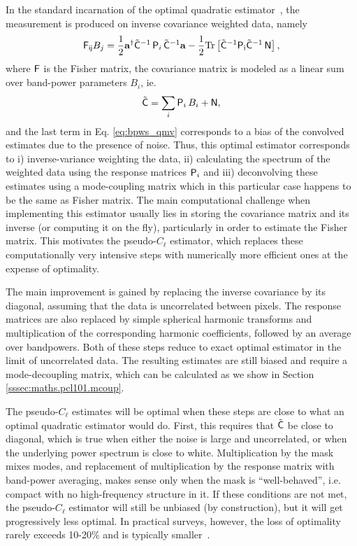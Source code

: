\documentclass[usenatbib]{mnrasb}
\newcommand{\va}{{\mathbf{a}}}
\begin{document}
        In the standard incarnation of the optimal quadratic estimator~\citep{1998PhRvD..57.2117B}, the measurement is produced on inverse covariance weighted data, namely
        \begin{equation}
          {\sf F_{ij}} B_j = \frac{1}{2}\va^\dagger \tilde{\sf C}^{-1}\,{\sf P}_i\,\tilde{\sf C}^{-1} \va -
          \frac{1}{2}\rm{Tr}\left[\tilde{\sf C}^{-1}{\sf P}_i\tilde{\sf C}^{-1}\,{\sf N} \right],
        \end{equation}
        where ${\sf F}$ is the Fisher matrix, the covariance matrix is modeled as a linear sum over band-power parameters $B_i$, ie.
        \begin{equation}\label{eq:bpws_qmv}
          \tilde{\sf C} = \sum_i {\sf P}_i\,B_i + {\sf N},
        \end{equation}
        and the last term in Eq. \ref{eq:bpws_qmv} corresponds to a bias of the convolved estimates due to the presence of noise. Thus, this optimal estimator corresponds to i) inverse-variance weighting the data, ii) calculating the spectrum of the weighted data using the response matrices ${\sf P}_i$ and iii) deconvolving these estimates using a mode-coupling matrix which in this particular case happens to be the same as Fisher matrix. The main computational challenge when implementing this estimator usually lies in storing the covariance matrix and its inverse (or computing it on the fly), particularly in order to estimate the Fisher matrix. This motivates the pseudo-$C_\ell$ estimator, which replaces these computationally very intensive steps with numerically more efficient ones at the expense of optimality.

        The main improvement is gained by replacing the inverse covariance by its diagonal, assuming that the data is uncorrelated between pixels. The response matrices are also replaced by simple spherical harmonic transforms and multiplication of the corresponding harmonic coefficients, followed by an average over bandpowers. Both of these steps reduce to exact optimal estimator in the limit of uncorrelated data. The resulting estimates are still biased and require a mode-decoupling matrix, which can be calculated as we show in Section \ref{sssec:maths.pcl101.mcoup}. 

        The pseudo-$C_\ell$ estimates will be optimal when these steps are close to what an optimal quadratic estimator would do. First, this requires that $\tilde{\sf C}$ be close to diagonal, which is true when either the noise is large and uncorrelated, or when the underlying power spectrum is close to white. Multiplication by the mask mixes modes, and replacement of multiplication by the response matrix with band-power averaging, makes sense only when the mask is ``well-behaved'', i.e. compact with no high-frequency structure in it. If these conditions are not met, the pseudo-$C_\ell$ estimator will still be unbiased (by construction), but it will get progressively less optimal. In practical surveys, however, the loss of optimality rarely exceeds 10-20\% and is typically smaller~\citep{2013MNRAS.435.1857L}.
\end{document}
